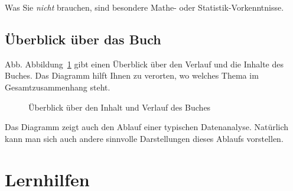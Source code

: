\documentclass[
  letterpaper,
  oneside,
  open=any]{scrbook}
\theoremstyle{definition}
\theoremstyle{definition}
\theoremstyle{definition}
\theoremstyle{remark}
\begin{document}
Was Sie \emph{nicht} brauchen, sind besondere Mathe- oder
Statistik-Vorkenntnisse.

\subsection{Überblick über das
Buch}\label{uxfcberblick-uxfcber-das-buch}

Abb. Abbildung~\ref{fig-ueberblick} gibt einen Überblick über den
Verlauf und die Inhalte des Buches. Das Diagramm hilft Ihnen zu
verorten, wo welches Thema im Gesamtzusammenhang steht.

\begin{figure}


\caption{\label{fig-ueberblick}Überblick über den Inhalt und Verlauf des
Buches}

\end{figure}%

Das Diagramm zeigt auch den Ablauf einer typischen Datenanalyse.
Natürlich kann man sich auch andere sinnvolle Darstellungen dieses
Ablaufs vorstellen.

\section{Lernhilfen}\label{lernhilfen}
\end{document}

